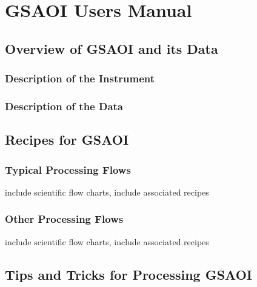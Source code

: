 \documentclass[letterpaper,10pt,english]{sphinxmanual}
\begin{document}
\chapter{GSAOI Users Manual}
\label{GSAOIcontents::doc}\label{GSAOIcontents:gsaoi-users-manual}\label{GSAOIcontents:id1}

\section{Overview of GSAOI and its Data}
\label{GSAOI/instrument:gsaoi-instrument-overview}\label{GSAOI/instrument::doc}\label{GSAOI/instrument:overview-of-gsaoi-and-its-data}

\subsection{Description of the Instrument}
\label{GSAOI/instrument:description-of-the-instrument}

\subsection{Description of the Data}
\label{GSAOI/instrument:description-of-the-data}

\section{Recipes for GSAOI}
\label{GSAOI/recipes:gsaoi-recipes-and-flows}\label{GSAOI/recipes::doc}\label{GSAOI/recipes:recipes-for-gsaoi}

\subsection{Typical Processing Flows}
\label{GSAOI/recipes:typical-processing-flows}
include scientific flow charts, include associated recipes


\subsection{Other Processing Flows}
\label{GSAOI/recipes:other-processing-flows}
include scientific flow charts, include associated recipes


\section{Tips and Tricks for Processing GSAOI}
\label{GSAOI/tipstricks:gsaoi-tips-tricks}\label{GSAOI/tipstricks:tips-and-tricks-for-processing-gsaoi}\label{GSAOI/tipstricks::doc}
\end{document}
